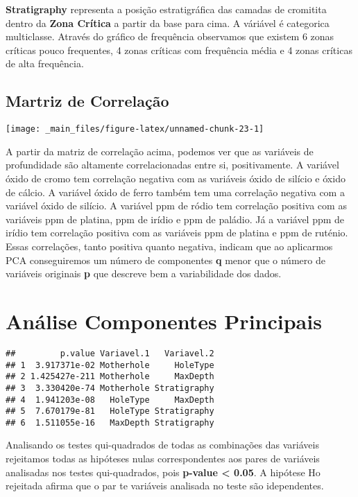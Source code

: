 \documentclass[
]{article}
\begin{document}
\textbf{Stratigraphy} representa a posição estratigráfica das camadas de cromitita dentro da \textbf{Zona Crítica} a partir da base para cima. A váriável é categorica multiclasse. Através do gráfico de frequência observamos que existem 6 zonas críticas pouco frequentes, 4 zonas críticas com frequência média e 4 zonas críticas de alta frequência.

\hypertarget{martriz-de-correlauxe7uxe3o}{%
\subsection{Martriz de Correlação}\label{martriz-de-correlauxe7uxe3o}}

\begin{center}\texttt{[image: \_main\_files/figure-latex/unnamed-chunk-23-1]} \end{center}

A partir da matriz de correlação acima, podemos ver que as variáveis de profundidade são altamente correlacionadas entre si, positivamente. A variável óxido de cromo tem correlação negativa com as variáveis óxido de silício e óxido de cálcio. A variável óxido de ferro também tem uma correlação negativa com a variável óxido de silício. A variável ppm de ródio tem correlação positiva com as variáveis ppm de platina, ppm de irídio e ppm de paládio. Já a variável ppm de irídio tem correlação positiva com as variáveis ppm de platina e ppm de ruténio.
Essas correlações, tanto positiva quanto negativa, indicam que ao aplicarmos PCA conseguiremos um número de componentes \textbf{q} menor que o número de variáveis originais \textbf{p} que descreve bem a variabilidade dos dados.

\newpage

\hypertarget{anuxe1lise-componentes-principais}{%
\section{Análise Componentes Principais}\label{anuxe1lise-componentes-principais}}

\begin{verbatim}
##         p.value Variavel.1   Variavel.2
## 1  3.917371e-02 Motherhole     HoleType
## 2 1.425427e-211 Motherhole     MaxDepth
## 3  3.330420e-74 Motherhole Stratigraphy
## 4  1.941203e-08   HoleType     MaxDepth
## 5  7.670179e-81   HoleType Stratigraphy
## 6  1.511055e-16   MaxDepth Stratigraphy
\end{verbatim}

Analisando os testes qui-quadrados de todas as combinações das variáveis rejeitamos todas as hipóteses nulas correspondentes aos pares de variáveis analisadas nos testes qui-quadrados, pois \textbf{p-value \textless{} 0.05}. A hipótese Ho rejeitada afirma que o par te variáveis analisada no teste são idependentes.
\end{document}
